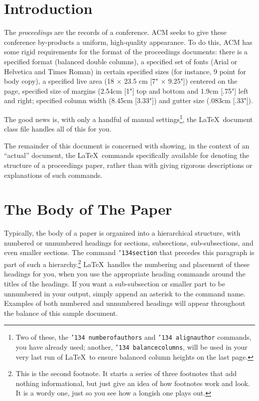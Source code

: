 \documentclass{sigkddExp}
\begin{document}
\section{Introduction}
The \textit{proceedings} are the records of a conference.
ACM seeks to give these conference by-products a uniform,
high-quality appearance.  To do this, ACM has some rigid
requirements for the format of the proceedings documents: there
is a specified format (balanced  double columns), a specified
set of fonts (Arial or Helvetica and Times Roman) in
certain specified sizes (for instance, 9 point for body copy),
a specified live area (18 $\times$ 23.5 cm [7" $\times$ 9.25"]) centered on
the page, specified size of margins (2.54cm [1"] top and
bottom and 1.9cm [.75"] left and right; specified column width
(8.45cm [3.33"]) and gutter size (.083cm [.33"]).

The good news is, with only a handful of manual
settings\footnote{Two of these, the {\texttt{\char'134 numberofauthors}}
and {\texttt{\char'134 alignauthor}} commands, you have
already used; another, {\texttt{\char'134 balancecolumns}}, will
be used in your very last run of \LaTeX\ to ensure
balanced column heights on the last page.}, the \LaTeX\ document
class file handles all of this for you.

The remainder of this document is concerned with showing, in
the context of an ``actual'' document, the \LaTeX\ commands
specifically available for denoting the structure of a
proceedings paper, rather than with giving rigorous descriptions
or explanations of such commands.

\section{The Body of The Paper}
Typically, the body of a paper is organized
into a hierarchical structure, with numbered or unnumbered
headings for sections, subsections, sub-subsections, and even
smaller sections.  The command \texttt{{\char'134}section} that
precedes this paragraph is part of such a
hierarchy.\footnote{This is the second footnote.  It
starts a series of three footnotes that add nothing
informational, but just give an idea of how footnotes work
and look. It is a wordy one, just so you see
how a longish one plays out.} \LaTeX\ handles the numbering
and placement of these headings for you, when you use
the appropriate heading commands around the titles
of the headings.  If you want a sub-subsection or
smaller part to be unnumbered in your output, simply append an
asterisk to the command name.  Examples of both
numbered and unnumbered headings will appear throughout the
balance of this sample document.
\end{document}

